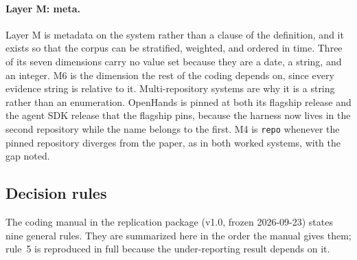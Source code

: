 
\paragraph{Layer M: meta.}\label{subsec:layer-m}
Layer M is metadata on the system rather than a clause of the definition, and it exists so that the
corpus can be stratified, weighted, and ordered in time. Three of its seven dimensions carry no value set
because they are a date, a string, and an integer. M6 is the dimension the rest of the coding depends on,
since every evidence string is relative to it. Multi-repository systems are why it is a string rather
than an enumeration. OpenHands is pinned at both its flagship release and the agent SDK release that the
flagship pins, because the harness now lives in the second repository while the name belongs to the
first. M4 is \texttt{repo} whenever the pinned repository diverges from the paper, as in both worked
systems, with the gap noted.


\subsection{Decision rules}
\label{subsec:coding-rules}

The coding manual in the replication package (v1.0, frozen 2026-09-23) states nine general rules. They
are summarized here in the order the manual gives them; rule~5 is reproduced in full because the
under-reporting result depends on it.

